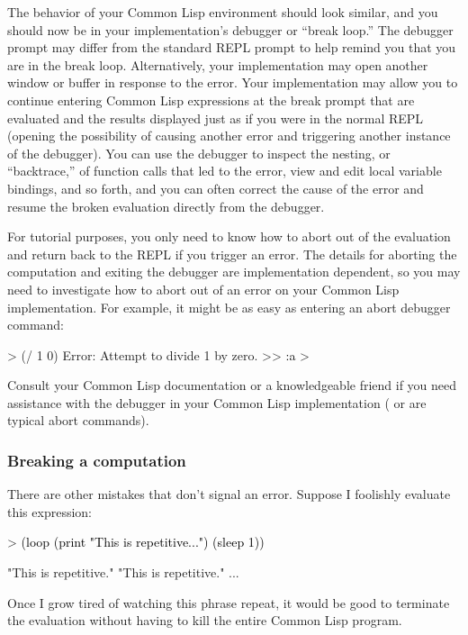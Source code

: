 \documentclass[10pt,twoside,english,pdftex]{article}
\begin{document}
The behavior of your Common Lisp environment should look similar, and you
should now be in your implementation's debugger or ``break loop.''  The
debugger prompt may differ from the standard REPL prompt to help remind you
that you are in the break loop.  Alternatively, your implementation may open
another window or buffer in response to the error.  Your implementation may
allow you to continue entering Common Lisp expressions at the break prompt
that are evaluated and the results displayed just as if you were in the normal
REPL (opening the possibility of causing another error and triggering another
instance of the debugger).  You can use the debugger to inspect the nesting,
or ``backtrace,'' of function calls that led to the error, view and edit local
variable bindings, and so forth, and you can often correct the cause of the
error and resume the broken evaluation directly from the debugger.

For tutorial purposes, you only need to know how to abort out of the
evaluation and return back to the REPL if you trigger an error.  The details
for aborting the computation and exiting the debugger are implementation
dependent, so you may need to investigate how to abort out of an error on your
Common Lisp implementation.  For example, it might be as easy as entering an
abort debugger command:
%
\begin{example}\color{darkergray}%
  > (/ 1 0)
  Error: Attempt to divide 1 by zero.
  >> \textcolor{black}{:a}
  >
\end{example}
%
Consult your Common Lisp documentation or a knowledgeable friend if
you need assistance with the debugger in your Common Lisp
implementation ( or  are typical abort commands).

\subsubsection*{Breaking a computation}

There are other mistakes that don't signal an error.  Suppose I
foolishly evaluate this expression:
%
\begin{example}\color{darkergray}%
  > \textcolor{black}{(loop (print "This is repetitive...") (sleep 1))}

  "This is repetitive." 
  "This is repetitive." 
       ...
\end{example}
%
Once I grow tired of watching this phrase repeat, it would be good to
terminate the evaluation without having to kill the entire Common Lisp
program.
\end{document}
